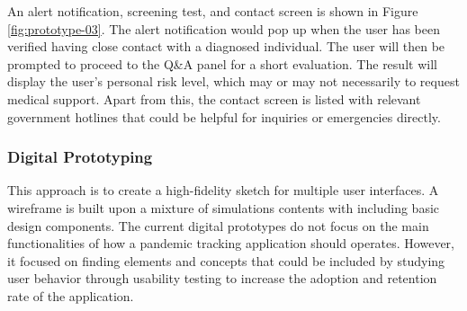       \par An alert notification, screening test, and contact screen is shown in Figure \ref{fig:prototype-03}. The alert notification would pop up when the user has been verified having close contact with a diagnosed individual. The user will then be prompted to proceed to the Q\&A panel for a short evaluation. The result will display the user's personal risk level, which may or may not necessarily to request medical support. Apart from this, the contact screen is listed with relevant government hotlines that could be helpful for inquiries or emergencies directly.

    \subsubsection{Digital Prototyping}
      \par This approach is to create a high-fidelity sketch for multiple user interfaces. A wireframe is built upon
      a mixture of simulations contents with including basic design components. The current digital
      prototypes do not focus on the main functionalities of how a pandemic tracking application should
      operates. However, it focused on finding elements and concepts that could be included by studying
      user behavior through usability testing to increase the adoption and retention rate of the application.


